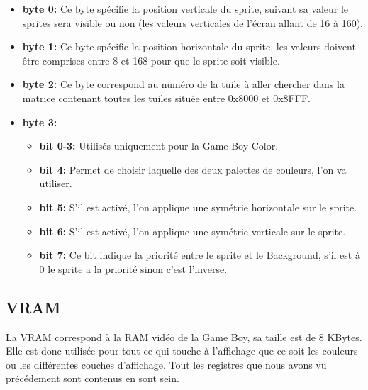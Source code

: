\documentclass{report}
\begin{document}
\begin{itemize}
\item \textbf{byte 0:}
	Ce byte spécifie la position verticale du sprite, suivant sa valeur le sprites sera visible ou non (les valeurs verticales de l'écran allant de 16 à 160).\\
\item \textbf{byte 1:}
	Ce byte spécifie la position horizontale du sprite, les valeurs doivent être comprises entre 8 et 168 pour que le sprite soit visible.\\
\item \textbf{byte 2:}
	Ce byte correspond au numéro de la tuile à aller chercher dans la matrice contenant toutes les tuiles située entre 0x8000 et 0x8FFF.\\
\item \textbf{byte 3:}
	\begin{itemize}
	\item \textbf{bit 0-3:}
		Utilisés uniquement pour la Game Boy Color.\\
	\item \textbf{bit 4:}
		Permet de choisir laquelle des deux palettes de couleurs, l'on va utiliser.\\
	\item \textbf{bit 5:}
		S'il est activé, l'on applique une symétrie horizontale sur le sprite.\\
	\item \textbf{bit 6:}
		S'il est activé, l'on applique une symétrie verticale sur le sprite.\\
	\item \textbf{bit 7:}
		Ce bit indique la priorité entre le sprite et le Background, s'il est à 0 le sprite a la priorité sinon c'est l'inverse.\\
	\end{itemize}
	
\end{itemize}

\subsection{VRAM}
La VRAM correspond à la RAM vidéo de la Game Boy, sa taille est de 8 KBytes. Elle est donc utilisée pour tout ce qui touche à l'affichage que ce soit les couleurs ou les différentes couches d'affichage. Tout les registres que nous avons vu précédement sont contenus en sont sein.
	
\end{document}
